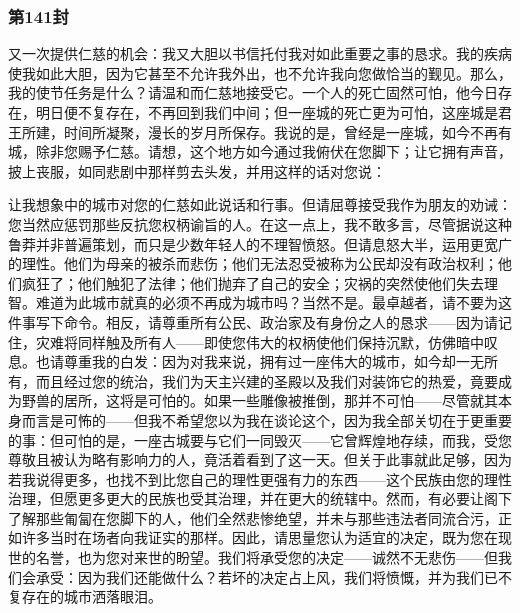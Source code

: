 
\subsubsection{第141封}

\par

又一次提供仁慈的机会：我又大胆以书信托付我对如此重要之事的恳求。我的疾病使我如此大胆，因为它甚至不允许我外出，也不允许我向您做恰当的觐见。那么，我的使节任务是什么？请温和而仁慈地接受它。一个人的死亡固然可怕，他今日存在，明日便不复存在，不再回到我们中间；但一座城的死亡更为可怕，这座城是君王所建，时间所凝聚，漫长的岁月所保存。我说的是，曾经是一座城，如今不再有城，除非您赐予仁慈。请想，这个地方如今通过我俯伏在您脚下；让它拥有声音，披上丧服，如同悲剧中那样剪去头发，并用这样的话对您说：\par

\par

让我想象中的城市对您的仁慈如此说话和行事。但请屈尊接受我作为朋友的劝诫：您当然应惩罚那些反抗您权柄谕旨的人。在这一点上，我不敢多言，尽管据说这种鲁莽并非普遍策划，而只是少数年轻人的不理智愤怒。但请息怒大半，运用更宽广的理性。他们为母亲的被杀而悲伤；他们无法忍受被称为公民却没有政治权利；他们疯狂了；他们触犯了法律；他们抛弃了自己的安全；灾祸的突然使他们失去理智。难道为此城市就真的必须不再成为城市吗？当然不是。最卓越者，请不要为这件事写下命令。相反，请尊重所有公民、政治家及有身份之人的恳求——因为请记住，灾难将同样触及所有人——即使您伟大的权柄使他们保持沉默，仿佛暗中叹息。也请尊重我的白发：因为对我来说，拥有过一座伟大的城市，如今却一无所有，而且经过您的统治，我们为天主兴建的圣殿以及我们对装饰它的热爱，竟要成为野兽的居所，这将是可怕的。如果一些雕像被推倒，那并不可怕——尽管就其本身而言是可怖的——但我不希望您以为我在谈论这个，因为我全部关切在于更重要的事：但可怕的是，一座古城要与它们一同毁灭——它曾辉煌地存续，而我，受您尊敬且被认为略有影响力的人，竟活着看到了这一天。但关于此事就此足够，因为若我说得更多，也找不到比您自己的理性更强有力的东西——这个民族由您的理性治理，但愿更多更大的民族也受其治理，并在更大的统辖中。然而，有必要让阁下了解那些匍匐在您脚下的人，他们全然悲惨绝望，并未与那些违法者同流合污，正如许多当时在场者向我证实的那样。因此，请思量您认为适宜的决定，既为您在现世的名誉，也为您对来世的盼望。我们将承受您的决定——诚然不无悲伤——但我们会承受：因为我们还能做什么？若坏的决定占上风，我们将愤慨，并为我们已不复存在的城市洒落眼泪。\par

